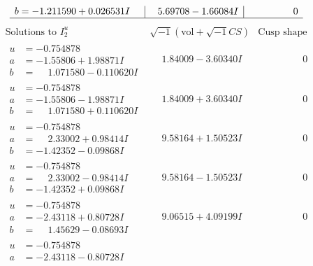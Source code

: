 \documentclass[1p]{elsarticle_modified}
\theoremstyle{definition}
\newcommand{\I}{\sqrt{-1}}
\begin{document}
$$\begin{array}{c|c|c}
\begin{aligned}
b &= -1.211590 + 0.026531 I\end{aligned}
 & \phantom{-}5.69708 - 1.66084 I & \phantom{-0.000000 } 0\\
 \hline 
 \end{array}$$\newpage$$\begin{array}{c|c|c}  
\text{Solutions to }I^u_{2}& \I (\text{vol} + \sqrt{-1}CS) & \text{Cusp shape}\\
 \hline 
\begin{aligned}
u &= -0.754878\phantom{ +0.000000I} \\
a &= -1.55806 + 1.98871 I \\
b &= \phantom{-}1.071580 - 0.110620 I\end{aligned}
 & \phantom{-}1.84009 - 3.60340 I & \phantom{-0.000000 } 0 \\ \hline\begin{aligned}
u &= -0.754878\phantom{ +0.000000I} \\
a &= -1.55806 - 1.98871 I \\
b &= \phantom{-}1.071580 + 0.110620 I\end{aligned}
 & \phantom{-}1.84009 + 3.60340 I & \phantom{-0.000000 } 0 \\ \hline\begin{aligned}
u &= -0.754878\phantom{ +0.000000I} \\
a &= \phantom{-}2.33002 + 0.98414 I \\
b &= -1.42352 - 0.09868 I\end{aligned}
 & \phantom{-}9.58164 + 1.50523 I & \phantom{-0.000000 } 0 \\ \hline\begin{aligned}
u &= -0.754878\phantom{ +0.000000I} \\
a &= \phantom{-}2.33002 - 0.98414 I \\
b &= -1.42352 + 0.09868 I\end{aligned}
 & \phantom{-}9.58164 - 1.50523 I & \phantom{-0.000000 } 0 \\ \hline\begin{aligned}
u &= -0.754878\phantom{ +0.000000I} \\
a &= -2.43118 + 0.80728 I \\
b &= \phantom{-}1.45629 - 0.08693 I\end{aligned}
 & \phantom{-}9.06515 + 4.09199 I & \phantom{-0.000000 } 0 \\ \hline\begin{aligned}
u &= -0.754878\phantom{ +0.000000I} \\
a &= -2.43118 - 0.80728 I \\

\end{aligned}
\end{array}$$
\end{document}
